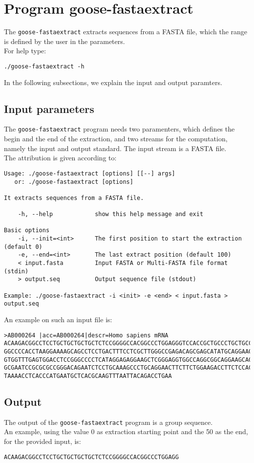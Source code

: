 \section{Program goose-fastaextract}
The \texttt{goose-fastaextract} extracts sequences from a FASTA file, which the range is defined by the user in the parameters.\\
For help type:
\begin{lstlisting}
./goose-fastaextract -h
\end{lstlisting}
In the following subsections, we explain the input and output paramters.

\subsection{Input parameters}

The \texttt{goose-fastaextract} program needs two paramenters, which defines the begin and the end of the extraction, and two streams for the computation, namely the input and output standard. The input stream is a FASTA file.\\
The attribution is given according to:
\begin{lstlisting}
Usage: ./goose-fastaextract [options] [[--] args]
   or: ./goose-fastaextract [options]

It extracts sequences from a FASTA file.

    -h, --help            show this help message and exit

Basic options
    -i, --init=<int>      The first position to start the extraction (default 0)
    -e, --end=<int>       The last extract position (default 100)
    < input.fasta         Input FASTA or Multi-FASTA file format (stdin)
    > output.seq          Output sequence file (stdout)

Example: ./goose-fastaextract -i <init> -e <end> < input.fasta > output.seq
\end{lstlisting}
An example on such an input file is:
\begin{lstlisting}
>AB000264 |acc=AB000264|descr=Homo sapiens mRNA 
ACAAGACGGCCTCCTGCTGCTGCTGCTCTCCGGGGCCACGGCCCTGGAGGGTCCACCGCTGCCCTGCTGCCATTGTCCCC
GGCCCCACCTAAGGAAAAGCAGCCTCCTGACTTTCCTCGCTTGGGCCGAGACAGCGAGCATATGCAGGAAGCGGCAGGAA
GTGGTTTGAGTGGACCTCCGGGCCCCTCATAGGAGAGGAAGCTCGGGAGGTGGCCAGGCGGCAGGAAGCAGGCCAGTGCC
GCGAATCCGCGCGCCGGGACAGAATCTCCTGCAAAGCCCTGCAGGAACTTCTTCTGGAAGACCTTCTCCACCCCCCCAGC
TAAAACCTCACCCATGAATGCTCACGCAAGTTTAATTACAGACCTGAA
\end{lstlisting}

\subsection{Output}
The output of the \texttt{goose-fastaextract} program is a group sequence.\\
An example, using the value 0 as extraction starting point and the 50 as the end, for the provided input, is:
\begin{lstlisting}
ACAAGACGGCCTCCTGCTGCTGCTGCTCTCCGGGGCCACGGCCCTGGAGG
\end{lstlisting}